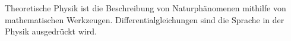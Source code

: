 Theoretische Physik ist die Beschreibung von Naturphänomenen mithilfe von mathematischen Werkzeugen. 
Differentialgleichungen sind die Sprache in der Physik ausgedrückt wird. 
